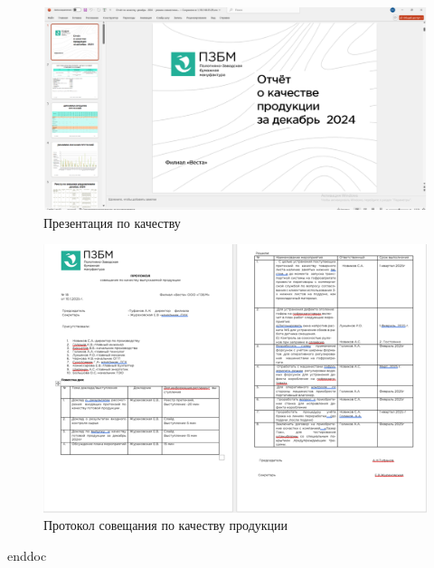 \begin{figure}
\begin{center}
 \includegraphics[height=0.35\textheight, keepaspectratio]{Pics/VIIIкачество.png}
\end{center}
 \caption{Презентация по качеству}
 \label{pic:/VIIIкачество}
\end{figure}

\begin{figure}
\begin{center}
 \includegraphics[height=0.42\textheight, keepaspectratio]{Pics/VIIIсовещание.png}
\end{center}
 \caption{Протокол совещания по качеству продукции}
 \label{pic:/VIIIсовещание}
\end{figure}
\clearpage
 {enddoc}
